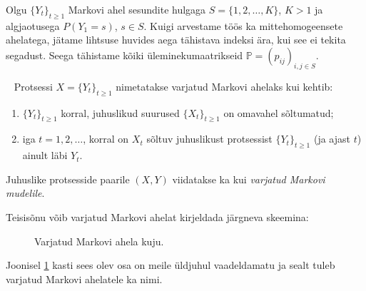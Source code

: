 Olgu $\{Y_t\}_{t\geq1}$ Markovi ahel sesundite hulgaga $S = \{1,2,\dots,K\}$, $K>1$ ja algjaotusega $P(Y_1=s)$, $s \in S$. Kuigi arvestame töös ka mittehomogeensete ahelatega, jätame lihtsuse huvides aega tähistava indeksi ära, kui see ei tekita segadust. Seega tähistame kõiki üleminekumaatrikseid $\mathbb{P} = (p_{ij})_{i,j \in S}$.


\begin{definition}~\citep{lember10}
	Protsessi $X = \{Y_t\}_{t\geq1}$ nimetatakse varjatud Markovi ahelaks kui kehtib:

	\begin{enumerate}
		\item $\{Y_t\}_{t\geq1}$ korral, juhuslikud suurused $\{X_t\}_{t\geq1}$ on omavahel sõltumatud;
		\item iga $t = 1,2,\dots$, korral on $X_t$ sõltuv juhuslikust protsessist $\{Y_t\}_{t\geq1}$ (ja ajast $t$) ainult läbi $Y_t$.
	\end{enumerate}

	Juhuslike protsesside paarile $(X, Y)$ viidatakse ka kui \textit{varjatud Markovi mudelile}.
\end{definition}

Teisisõnu võib varjatud Markovi ahelat kirjeldada järgneva skeemina:

\setcounter{figure}{0}

\begin{figure}[h]
	\centering
	
	\caption{Varjatud Markovi ahela kuju.}
	\label{fig:HMM}
\end{figure}

Joonisel \ref{fig:HMM} kasti sees olev osa on meile üldjuhul vaadeldamatu ja sealt tuleb varjatud Markovi ahelatele ka nimi.

